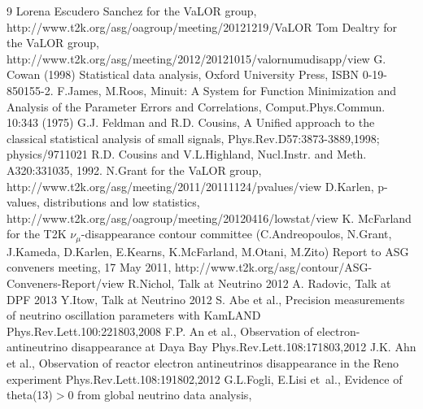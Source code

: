 \begin{thebibliography}{9}
%
  Lorena Escudero Sanchez for the VaLOR group, 
  http://www.t2k.org/asg/oagroup/meeting/20121219/VaLOR%
  Tom Dealtry for the VaLOR group,
  http://www.t2k.org/asg/meeting/2012/20121015/valornumudisapp/view
%
%
  G. Cowan (1998) Statistical data analysis, 
  Oxford University Press, ISBN 0-19-850155-2.
  F.James, M.Roos, Minuit: A System for Function Minimization and Analysis of the 
  Parameter Errors and Correlations, Comput.Phys.Commun. 10:343 (1975)
  G.J. Feldman and R.D. Cousins,
  A Unified approach to the classical statistical analysis of small signals,
  Phys.Rev.D57:3873-3889,1998; physics/9711021
  R.D. Cousins and V.L.Highland, 
  Nucl.Instr. and Meth. A320:331035, 1992.
  N.Grant for the VaLOR group,
  http://www.t2k.org/asg/meeting/2011/20111124/pvalues/view
  D.Karlen,
  p-values, distributions and low statistics,
  http://www.t2k.org/asg/oagroup/meeting/20120416/lowstat/view
%
%
  K. McFarland for the T2K $\nu_{\mu}$-disappearance contour committee 
  (C.Andreopoulos, N.Grant, J.Kameda, D.Karlen, E.Kearns, K.McFarland, M.Otani, M.Zito)
  Report to ASG conveners meeting, 17 May 2011,
  http://www.t2k.org/asg/contour/ASG-Conveners-Report/view
%
%
  R.Nichol,
  Talk at Neutrino 2012
  A. Radovic,
  Talk at DPF 2013
  Y.Itow,
  Talk at Neutrino 2012
%
%
  S. Abe et al.,
  Precision measurements of neutrino oscillation parameters with KamLAND
  Phys.Rev.Lett.100:221803,2008
  F.P. An et al.,
  Observation of electron-antineutrino disappearance at Daya Bay
  Phys.Rev.Lett.108:171803,2012
  J.K. Ahn et al.,
  Observation of reactor electron antineutrinos disappearance in the Reno experiment
  Phys.Rev.Lett.108:191802,2012
%
%
  G.L.Fogli, E.Lisi et~al.,
  Evidence of theta(13)$>$0 from global neutrino data analysis,

\end{thebibliography}
